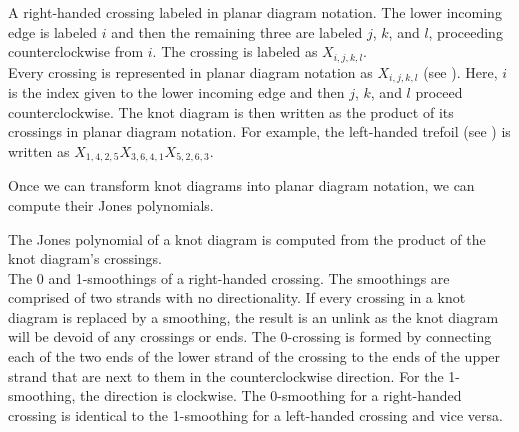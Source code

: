 \begin{paper}
{A right-handed crossing labeled in planar diagram notation.
The lower incoming edge is labeled $i$ and then the remaining three are labeled
$j$, $k$, and $l$, proceeding counterclockwise from $i$.
The crossing is labeled as $X_{i,j,k,l}$.}\\

Every crossing is represented in planar diagram notation as $X_{i,j,k,l}$ (see
\figX).
Here, $i$ is the index given to the lower incoming edge and then $j$, $k$, and
$l$ proceed counterclockwise.
The knot diagram is then written as the product of its crossings in planar
diagram notation.
For example, the left-handed trefoil (see \figLabeled) is written as
$X_{1,4,2,5}X_{3,6,4,1}X_{5,2,6,3}$.



\noindent{}

Once we can transform knot diagrams into planar diagram notation, we can compute
their Jones polynomials.


The Jones polynomial of a knot diagram is computed from the product of the knot
diagram's crossings.\\

{The 0 and 1-smoothings of a right-handed crossing.
The smoothings are comprised of two strands with no directionality.
If every crossing in a knot diagram is replaced by a smoothing, the result is an
unlink as the knot diagram will be devoid of any crossings or ends.
The 0-crossing is formed by connecting each of the two ends of the lower strand
of the crossing to the ends of the upper strand that are next to them in the
counterclockwise direction.
For the 1-smoothing, the direction is clockwise.
The 0-smoothing for a right-handed crossing is identical to the 1-smoothing for
a left-handed crossing and vice versa.}


\end{paper}
